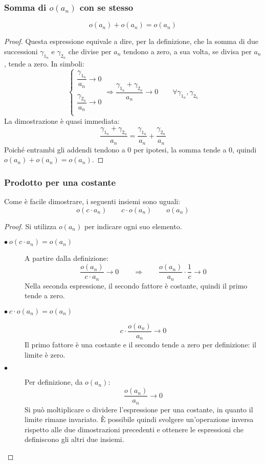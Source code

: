 \subsubsection{Somma di $o(a_n)$ con se stesso}
\begin{teor}
	\[
		o(a_n)+o(a_n)=o(a_n)
	\]
\end{teor}
\begin{proof}
	Questa espressione equivale a dire, per la definizione, che la somma di due successioni $\gamma_{1_n}$ e $\gamma_{2_n}$ che divise per $a_n$ tendono a zero, a sua volta, se divisa per $a_n$, tende a zero. In simboli:
	\[
		\begin{cases}
			\dfrac{\gamma_{1_n}}{a_n}\to0 \\\\
			\dfrac{\gamma_{2_n}}{a_n}\to0 \\
		\end{cases}\Rightarrow\frac{\gamma_{1_n}+\gamma_{2_n}}{a_n}\to0\qquad\forall\gamma_{1_n},\gamma_{2_n}
	\]
	La dimostrazione è quasi immediata:
	\[
		\frac{\gamma_{1_n}+\gamma_{2_n}}{a_n}=\frac{\gamma_{1_n}}{a_n}+\frac{\gamma_{2_n}}{a_n}
	\]
	Poiché entrambi gli addendi tendono a $0$ per ipotesi, la somma tende a $0$, quindi $o(a_n)+o(a_n)=o(a_n)$.
\end{proof}

\subsubsection{Prodotto per una costante}
Come è facile dimostrare, i seguenti insiemi sono uguali:
\[
	o(c\cdot a_n)\qquad c\cdot o(a_n)\qquad o(a_n)
\]
\begin{proof}
	Si utilizza $o(a_n)$ per indicare ogni suo elemento.
	\begin{description}
		\item[$\bullet~ o(c\cdot a_n)=o(a_n)$] A partire dalla definizione:
			\[
				\frac{o(a_n)}{c\cdot a_n}\to 0\qquad\Rightarrow\qquad\frac{o(a_n)}{a_n}\cdot \frac{1}{c}\to0
			\]
			Nella seconda espressione, il secondo fattore è costante, quindi il primo tende a zero.
		\item[$\bullet~ c\cdot o(a_n) = o(a_n)$]
			\[
				c\cdot \frac{o(a_n)}{a_n}\to0
			\]
			Il primo fattore è una costante e il secondo tende a zero per definizione: il limite è zero.
		\item[$\bullet$] Per definizione, da $o(a_n)$:
			\[
				\frac{o(a_n)}{a_n}\to0
			\]
			Si può moltiplicare o dividere l'espressione per una costante, in quanto il limite rimane invariato. È possibile quindi svolgere un'operazione inversa rispetto alle due dimostrazioni precedenti e ottenere le espressioni che definiscono gli altri due insiemi.
	\end{description}
\end{proof}

